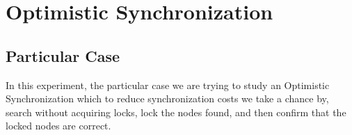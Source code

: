 


\section{\textbf{Optimistic Synchronization}}



\subsection{Particular Case}
\par
In this experiment, the particular case we are trying to study an Optimistic Synchronization which to reduce synchronization costs we take a chance by, search without acquiring locks, lock the nodes found, and then confirm that the locked nodes are correct.
\par



